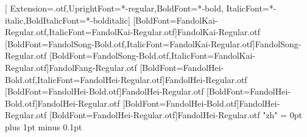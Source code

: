 \setsansfont{texgyreheros}[
 Extension=.otf,UprightFont=*-regular,BoldFont=*-bold,
 ItalicFont=*-italic,BoldItalicFont=*-bolditalic]
[BoldFont=FandolKai-Regular.otf,ItalicFont=FandolKai-Regular.otf]{FandolKai-Regular.otf}
[BoldFont=FandolSong-Bold.otf,ItalicFont=FandolKai-Regular.otf]{FandolSong-Regular.otf}
[BoldFont=FandolSong-Bold.otf,ItalicFont=FandolKai-Regular.otf]{FandolFang-Regular.otf}
[BoldFont=FandolHei-Bold.otf,ItalicFont=FandolHei-Regular.otf]{FandolHei-Regular.otf}
[BoldFont=FandolHei-Bold.otf]{FandolHei-Regular.otf}
[BoldFont=FandolHei-Bold.otf]{FandolHei-Regular.otf}
[BoldFont=FandolHei-Bold.otf]{FandolHei-Regular.otf}
[BoldFont=FandolHei-Regular.otf]{FandolHei-Regular.otf}
\XeTeXlinebreaklocale "zh"
\XeTeXlinebreakskip = 0pt plus 1pt minus 0.1pt
\newcommand\kaishu{\CJKfamily{kai}}
\newcommand\songti{\CJKfamily{song}}
\newcommand\heiti{\CJKfamily{hei}}
\newcommand\thmheiti{\CJKfamily{hei2}}
\newcommand\fangsong{\CJKfamily{fangsong}}
\renewcommand{\em}{\bfseries\CJKfamily{emfont}}
